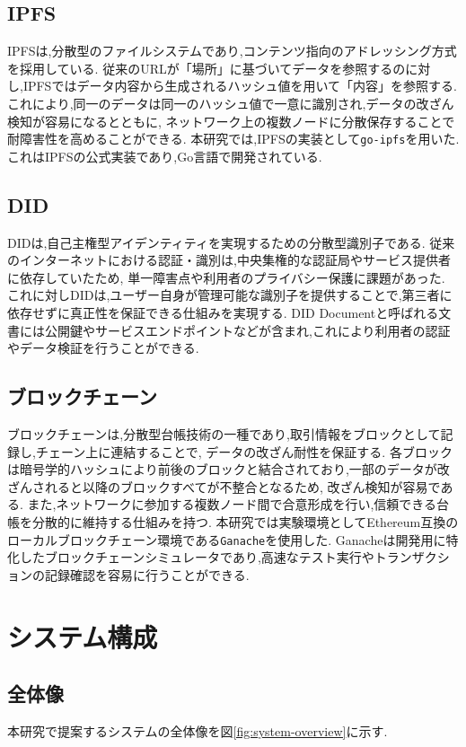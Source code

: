 \documentclass[a4paper,9pt,twocolumn]{ltjsarticle} %
\begin{document}
\subsection{IPFS}
IPFSは,分散型のファイルシステムであり,コンテンツ指向のアドレッシング方式を採用している.
従来のURLが「場所」に基づいてデータを参照するのに対し,IPFSではデータ内容から生成されるハッシュ値を用いて「内容」を参照する.
これにより,同一のデータは同一のハッシュ値で一意に識別され,データの改ざん検知が容易になるとともに,
ネットワーク上の複数ノードに分散保存することで耐障害性を高めることができる.
本研究では,IPFSの実装として\texttt{go-ipfs}を用いた.
これはIPFSの公式実装であり,Go言語で開発されている.

\subsection{DID}
DIDは,自己主権型アイデンティティを実現するための分散型識別子である.
従来のインターネットにおける認証・識別は,中央集権的な認証局やサービス提供者に依存していたため,
単一障害点や利用者のプライバシー保護に課題があった.
これに対しDIDは,ユーザー自身が管理可能な識別子を提供することで,第三者に依存せずに真正性を保証できる仕組みを実現する.
DID Documentと呼ばれる文書には公開鍵やサービスエンドポイントなどが含まれ,これにより利用者の認証やデータ検証を行うことができる.

\subsection{ブロックチェーン}
ブロックチェーンは,分散型台帳技術の一種であり,取引情報をブロックとして記録し,チェーン上に連結することで,
データの改ざん耐性を保証する.
各ブロックは暗号学的ハッシュにより前後のブロックと結合されており,一部のデータが改ざんされると以降のブロックすべてが不整合となるため,
改ざん検知が容易である.
また,ネットワークに参加する複数ノード間で合意形成を行い,信頼できる台帳を分散的に維持する仕組みを持つ.
本研究では実験環境としてEthereum互換のローカルブロックチェーン環境である\texttt{Ganache}を使用した.
Ganacheは開発用に特化したブロックチェーンシミュレータであり,高速なテスト実行やトランザクションの記録確認を容易に行うことができる.

\section{システム構成}

\subsection{全体像}
本研究で提案するシステムの全体像を図\ref{fig:system-overview}に示す.
\end{document}
